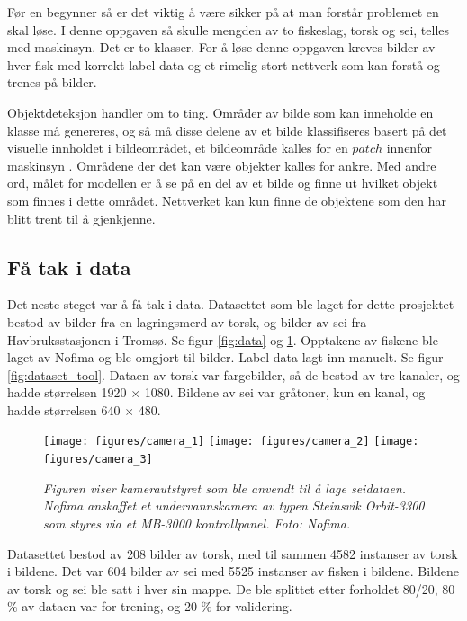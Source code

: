 Før en begynner så er det viktig å være sikker på at man forstår problemet en skal løse. I denne oppgaven så skulle mengden av to fiskeslag, torsk og sei, telles med maskinsyn. Det er to klasser. For å løse denne oppgaven kreves bilder av hver fisk med korrekt label-data og et rimelig stort nettverk som kan forstå og trenes på bilder.

Objektdeteksjon handler om to ting. Områder av bilde som kan inneholde en klasse må genereres, og så må disse delene av et bilde klassifiseres basert på det visuelle innholdet i bildeområdet, et bildeområde kalles for en $patch$ innenfor maskinsyn \cite{LeCun m.fl. 1998 s. 23}. Områdene der det kan være objekter kalles for ankre. Med andre ord, målet for modellen er å se på en del av et bilde og finne ut hvilket objekt som finnes i dette området. Nettverket kan kun finne de objektene som den har blitt trent til å gjenkjenne.

\subsection{Få tak i data}

Det neste steget var å få tak i data. Datasettet som ble laget for dette prosjektet bestod av bilder fra en lagringsmerd av torsk, og bilder av sei fra Havbruksstasjonen i Tromsø. Se figur \ref{fig:data} og \ref{fig:nofima}. Opptakene av fiskene ble laget av Nofima og ble omgjort til bilder. Label data lagt inn manuelt. Se figur \ref{fig:dataset_tool}. Dataen av torsk var fargebilder, så de bestod av tre kanaler, og hadde størrelsen 1920 $\times$ 1080. Bildene av sei var gråtoner, kun en kanal, og hadde størrelsen 640 $\times$ 480. %

\begin{figure}[h!]
\begin{center} 
\texttt{[image: figures/camera\_1]}
\texttt{[image: figures/camera\_2]}
\texttt{[image: figures/camera\_3]}
\caption{\small \sl Figuren viser kamerautstyret som ble anvendt til å lage seidataen. Nofima anskaffet et undervannskamera av typen Steinsvik Orbit-3300 som styres via et MB-3000 kontrollpanel. Foto: Nofima. \label{fig:nofima}} 
\end{center} 
\end{figure} 

Datasettet bestod av 208 bilder av torsk, med til sammen 4582 instanser av torsk i bildene. Det var 604 bilder av sei med 5525 instanser av fisken i bildene. Bildene av torsk og sei ble satt i hver sin mappe. De ble splittet etter forholdet 80/20, 80 \% av dataen var for trening, og 20 \% for validering.

